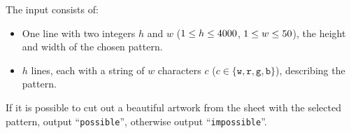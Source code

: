 \begin{Input}
    The input consists of:
    \begin{itemize}
        \item One line with two integers $h$ and $w$ ($1 \leq h \leq 4000$, $1 \leq w \leq 50$),
            the height and width of the chosen pattern.
        \item $h$ lines, each with a string of $w$ characters $c$ ($c \in \{\texttt{w}, \texttt{r}, \texttt{g}, \texttt{b}\}$),
            describing the pattern.
    \end{itemize}
\end{Input}

\begin{Output}
    If it is possible to cut out a beautiful artwork from the sheet with the selected pattern,
    output ``\texttt{possible}'', otherwise output ``\texttt{impossible}''.
\end{Output}
